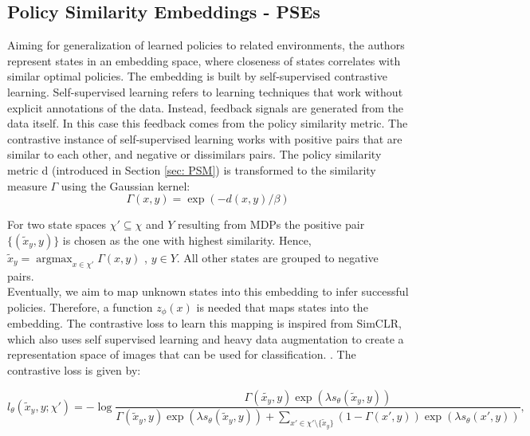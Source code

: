 \documentclass{usiinftr}
\DeclareMathOperator*{\argmax}{argmax}
\begin{document}
\subsection{Policy Similarity Embeddings - PSEs}
Aiming for generalization of learned policies to related environments, the authors represent states in an embedding space, where closeness of states correlates with similar optimal policies. The embedding is built by self-supervised contrastive learning. Self-supervised learning refers to learning techniques that work without explicit annotations of the data. \cite{tian2021understanding} Instead, feedback signals are generated from the data itself. In this case this feedback comes from the policy similarity metric.   The contrastive instance of self-supervised learning works with positive pairs that are similar to each other, and negative or dissimilars pairs. \cite{Hadsell06dimensionalityreduction} The policy similarity metric d (introduced in Section \ref{sec: PSM}) is transformed to the similarity measure $\Gamma$ using the Gaussian kernel:
\begin{equation} \label{Gaussian Kernel}
\Gamma (x,y) = \exp ( -d(x,y)/ \beta) 
\end{equation}

For two state spaces $\chi' \subseteq \chi$ and $Y$ resulting from MDPs the positive pair $\{( \tilde{x}_y , y) \}$ is chosen as the one with highest similarity. Hence, $ \tilde{x}_y = \argmax_{x \in \chi'} \Gamma (x,y)$ , $y \in Y $.
All other states are grouped to negative pairs.
\\
Eventually, we aim to map unknown states into this embedding to infer successful policies. 
Therefore, a function $z_{\phi}(x)$ is needed that maps states into the embedding. 
The contrastive loss to learn this mapping is inspired from SimCLR, which also uses self supervised learning and heavy data augmentation to create a representation space of images that can be used for classification. \cite{chen2020simple}. The contrastive loss is given by: 

\begin{equation}\label{contrastive loss}
l_{\theta} (\tilde{x}_y, y; \chi' ) = 
- \log \frac{\Gamma (\tilde{x_y}, y ) \exp(\lambda s_{\theta} (\tilde{x}_y, y))}
{\Gamma(\tilde{x}_y, y) \exp (\lambda s_{\theta}(\tilde{x}_y, y)) + \sum_{x'\in \chi' \setminus \{\tilde{x}_y \}} (1 - \Gamma (x',y)) \exp (\lambda s_{\theta} (x',y))},
\end{equation}
\end{document}
